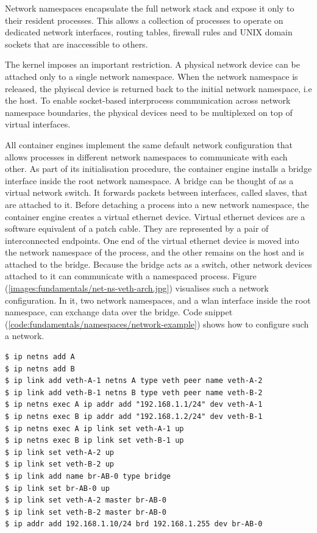 Network namespaces encapsulate the full network stack and expose it only to 
their resident processes. This allows a collection of processes to operate on 
dedicated network interfaces, routing tables, firewall rules and UNIX domain sockets 
that are inaccessible to others. 

The kernel imposes an important restriction. A physical network device can be attached only 
to a single network namespace. When the network namespace is released, the phyiscal device 
is returned back to the initial network namespace, i.e the host. To enable socket-based interprocess
communication across network namespace boundaries, 
the physical devices need to be multiplexed on top of virtual interfaces. 

All container engines implement the same default network configuration that allows processes 
in different network namespaces to communicate with each other. As part of its initialisation procedure,
the container engine installs a bridge interface inside the root network namespace.
A bridge can be thought of as a virtual network switch. 
It forwards packets between interfaces, called slaves, that are attached to it. 
Before detaching a process into a new network namespace, the container engine creates a 
virtual ethernet device. Virtual ethernet devices are a software equivalent of a patch cable. 
They are represented by a pair of interconnected endpoints. One end of the virtual ethernet device is moved 
into the network namespace of the process, and the other remains on the host and is attached 
to the bridge. Because the bridge acts as a switch, other network devices attached 
to it can communicate with a namespaced process. Figure (\ref{images:fundamentals/net-ns-veth-arch.jpg})
visualises such a network configuration. In it, two network namespaces, and a wlan interface
inside the root namespace, can exchange data over the bridge. Code snippet (\ref{code:fundamentals/namespaces/network-example})
shows how to configure such a network.
\clearpage

\begin{lstlisting}[label={code:fundamentals/namespaces/network-example}, style=bash, caption={Commands for configuring the network as shown in  Figure (\ref{images:fundamentals/net-ns-veth-arch.jpg})}]
$ ip netns add A 
$ ip netns add B 
$ ip link add veth-A-1 netns A type veth peer name veth-A-2
$ ip link add veth-B-1 netns B type veth peer name veth-B-2
$ ip netns exec A ip addr add "192.168.1.1/24" dev veth-A-1 
$ ip netns exec B ip addr add "192.168.1.2/24" dev veth-B-1
$ ip netns exec A ip link set veth-A-1 up 
$ ip netns exec B ip link set veth-B-1 up 
$ ip link set veth-A-2 up 
$ ip link set veth-B-2 up 
$ ip link add name br-AB-0 type bridge 
$ ip link set br-AB-0 up 
$ ip link set veth-A-2 master br-AB-0 
$ ip link set veth-B-2 master br-AB-0 
$ ip addr add 192.168.1.10/24 brd 192.168.1.255 dev br-AB-0
\end{lstlisting}

